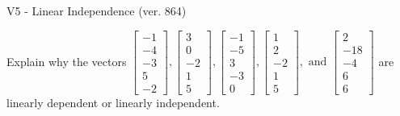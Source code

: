 \begin{exercise}
  \begin{exerciseTitle}V5 - Linear Independence (ver. 864)\end{exerciseTitle}
  \begin{exerciseStatement}
    Explain why the vectors \(\left[\begin{array}{r}
-1 \\
-4 \\
-3 \\
5 \\
-2
\end{array}\right] , \left[\begin{array}{r}
3 \\
0 \\
-2 \\
1 \\
5
\end{array}\right] , \left[\begin{array}{r}
-1 \\
-5 \\
3 \\
-3 \\
0
\end{array}\right] , \left[\begin{array}{r}
1 \\
2 \\
-2 \\
1 \\
5
\end{array}\right] , \text{ and } \left[\begin{array}{r}
2 \\
-18 \\
-4 \\
6 \\
6
\end{array}\right]\) are linearly dependent or linearly independent.	



\end{exerciseStatement}
\end{exercise}

